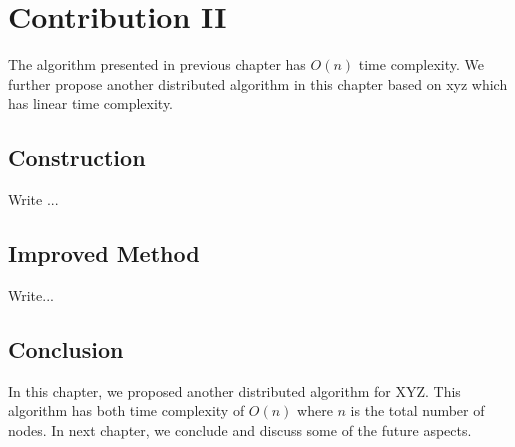 \chapter{Contribution II}

The algorithm presented in previous chapter has $O(n)$ time 
complexity. We further propose another
distributed algorithm in this chapter based on xyz which has linear time 
complexity.

\section{Construction}

Write ...

\section{Improved Method}

Write...

\section{Conclusion}
In this chapter, we proposed another distributed algorithm for
XYZ. This algorithm has both time complexity of $O(n)$ where $n$
is the total number of nodes.  In next chapter, we conclude and
discuss some of the future aspects.
